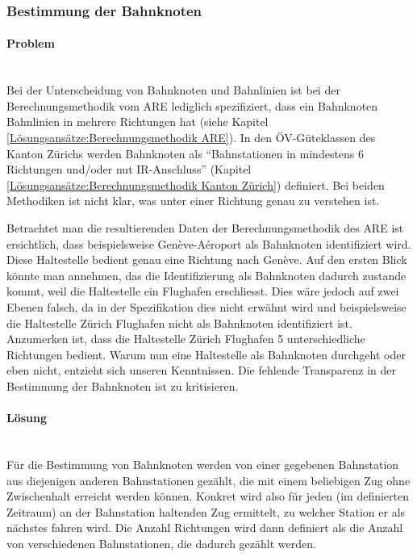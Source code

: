 \subsubsection{Bestimmung der Bahnknoten}
\label{Verbesserungsmöglichkeiten:Bestimmung der Bahnknoten}

\paragraph{Problem}~\\
Bei der Unterscheidung von Bahnknoten und Bahnlinien ist bei der Berechnungsmethodik vom \acs{ARE} lediglich spezifiziert, dass ein Bahnknoten Bahnlinien in mehrere Richtungen hat (siehe Kapitel \ref{Lösungsansätze:Berechnungsmethodik ARE}).
In den ÖV-Güteklassen des Kanton Zürichs werden Bahnknoten als "`Bahnstationen in mindestens 6 Richtungen und/oder nut IR-Anschluss"' (Kapitel \ref{Lösungsansätze:Berechnungsmethodik Kanton Zürich}) definiert.
Bei beiden Methodiken ist nicht klar, was unter einer Richtung genau zu verstehen ist.

Betrachtet man die resultierenden Daten der Berechnungsmethodik des \acs{ARE} ist ersichtlich, dass beispielsweise Genève-Aéroport als Bahnknoten identifiziert wird.
Diese Haltestelle bedient genau eine Richtung nach Genève.
Auf den ersten Blick könnte man annehmen, das die Identifizierung als Bahnknoten dadurch zustande kommt, weil die Haltestelle ein Flughafen erschliesst.
Dies wäre jedoch auf zwei Ebenen falsch, da in der Spezifikation dies nicht erwähnt wird und beispielsweise die Haltestelle Zürich Flughafen nicht als Bahnknoten identifiziert ist.
Anzumerken ist, dass die Haltestelle Zürich Flughafen 5 unterschiedliche Richtungen bedient.
Warum nun eine Haltestelle als Bahnknoten durchgeht oder eben nicht, entzieht sich unseren Kenntnissen.
Die fehlende Transparenz in der Bestimmung der Bahnknoten ist zu kritisieren.

\paragraph{Lösung}~\\
Für die Bestimmung von Bahnknoten werden von einer gegebenen Bahnstation aus diejenigen anderen Bahnstationen gezählt, die mit einem beliebigen Zug ohne Zwischenhalt erreicht werden können.
Konkret wird also für jeden (im definierten Zeitraum) an der Bahnstation haltenden Zug ermittelt, zu welcher Station er als nächstes fahren wird.
Die Anzahl Richtungen wird dann definiert als die Anzahl von verschiedenen Bahnstationen, die dadurch gezählt werden.

